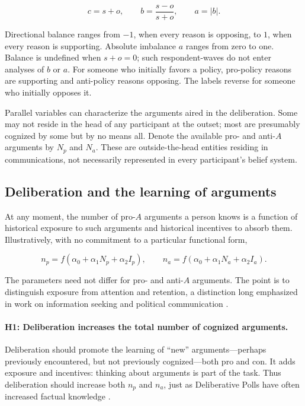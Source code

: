 \documentclass[11pt]{article}
\begin{document}
\begin{equation}
c=s+o, \qquad b=\frac{s-o}{s+o}, \qquad a=|b|.
\end{equation}

Directional balance ranges from $-1$, when every reason is opposing, to $1$, when every reason
is supporting. Absolute imbalance $a$ ranges from zero to one. Balance is undefined when
$s+o=0$; such respondent-waves do not enter analyses of $b$ or $a$. For someone who initially
favors a policy, pro-policy reasons are supporting and anti-policy reasons opposing. The labels
reverse for someone who initially opposes it.

Parallel variables can characterize the arguments aired in the deliberation. Some may not
reside in the head of any participant at the outset; most are presumably cognized by some but
by no means all. Denote the available pro- and anti-$A$ arguments by $N_p$ and $N_a$. These are
outside-the-head entities residing in communications, not necessarily represented in every
participant's belief system.

\subsection{Deliberation and the learning of arguments}

At any moment, the number of pro-$A$ arguments a person knows is a function of historical
exposure to such arguments and historical incentives to absorb them. Illustratively, with no
commitment to a particular functional form,

\begin{equation}
n_p=f(\alpha_0+\alpha_1N_p+\alpha_2I_p), \qquad
n_a=f(\alpha_0+\alpha_1N_a+\alpha_2I_a).
\end{equation}

The parameters need not differ for pro- and anti-$A$ arguments. The point is to distinguish
exposure from attention and retention, a distinction long emphasized in work on information
seeking and political communication \citep{atkin1973instrumental,chaffee1972interpersonal,
chaffee1973individual}.

\paragraph{H1: Deliberation increases the total number of cognized arguments.}
Deliberation should promote the learning of ``new'' arguments---perhaps previously
encountered, but not previously cognized---both pro and con. It adds exposure and incentives:
thinking about arguments is part of the task. Thus deliberation should increase both $n_p$ and
$n_a$, just as Deliberative Polls have often increased factual knowledge
\citep{hansen2004deliberative,luskin2009learning}.
\end{document}
